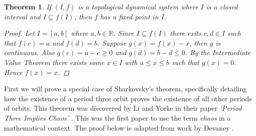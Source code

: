 \documentclass[11pt,a4paper,oneside]{memoir}
\theoremstyle{plain}
\newtheorem{thm}{Theorem}[chapter]
\theoremstyle{definition}
\begin{document}
\begin{thm} \label{thm:interval-fixed-points}
    If $(I, f)$ is a topological dynamical system where $I$ is a closed interval and $I \subseteq f(I)$, then $f$ has a fixed point in $I$.
    \begin{proof}
        Let $I = [a, b]$ where $a, b \in \mathbb{R}$. Since $I \subseteq f(I)$ there exits $c, d \in I$ such that $f(c) = a$ and $f(d) = b$. Suppose $g(x) = f(x) - x$, then $g$ is continuous. Also $g(c) = a - c \geq 0$ and $g(d) = b - d \leq 0$. By the Intermediate Value Theorem there exists some $x \in I$ with $a \leq x \leq b$ such that $g(x) = 0$. Hence $f(x) = x$.
    \end{proof}
\end{thm}

First we will prove a special case of Sharkovsky's theorem, specifically detailing how the existence of a period three orbit proves the existence of all other periods of orbits. This theorem was discovered by Li and Yorke in their paper \emph{'Period Three Implies Chaos'} \cite{li-yorke}. This was the first paper to use the term \emph{chaos} in a mathematical context. The proof below is adapted from work by Devaney \cite[Chapter 1.10]{devaney}.
\end{document}
